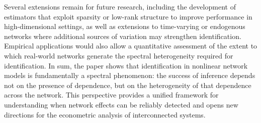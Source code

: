 \documentclass[12pt]{article}
\numberwithin{equation}{section}
\begin{document}
Several extensions remain for future research, including the development of estimators that exploit sparsity or low-rank structure to improve performance in high-dimensional settings, as well as extensions to time-varying or endogenous networks where additional sources of variation may strengthen identification. Empirical applications would also allow a quantitative assessment of the extent to which real-world networks generate the spectral heterogeneity required for identification. In sum, the paper shows that identification in nonlinear network models is fundamentally a spectral phenomenon: the success of inference depends not on the presence of dependence, but on the heterogeneity of that dependence across the network. This perspective provides a unified framework for understanding when network effects can be reliably detected and opens new directions for the econometric analysis of interconnected systems.






\end{document}
